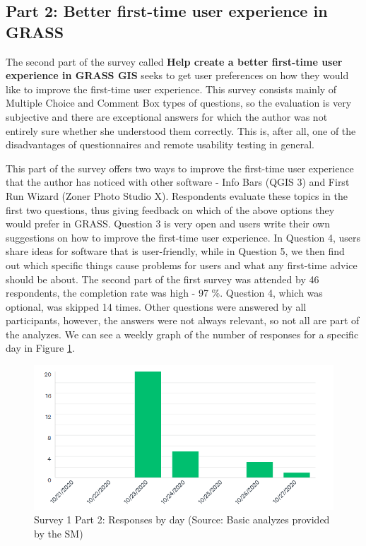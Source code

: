 \documentclass[a4paper,10pt,twoside]{article}
\begin{document}
\newpage
\vspace*{-1cm}
\subsection{Part 2: Better first-time user experience in GRASS}

\noindent The second part of the survey called \textbf{Help create a better first-time user experience in GRASS GIS} seeks to get user preferences on how they would like to improve the first-time user experience. This survey consists mainly of Multiple Choice and Comment Box types of questions, so the evaluation is very subjective and there are exceptional answers for which the author was not entirely sure whether she understood them correctly. This is, after all, one of the disadvantages of questionnaires and remote usability testing in general.

This part of the survey offers two ways to improve the first-time user experience that the author has noticed with other software - Info Bars (QGIS 3) and First Run Wizard (Zoner Photo Studio X). Respondents evaluate these topics in the first two questions, thus giving feedback on which of the above options they would prefer in GRASS. Question 3 is very open and users write their own suggestions on how to improve the first-time user experience. In Question 4, users share ideas for software that is user-friendly, while in Question 5, we then find out which specific things cause problems for users and what any first-time advice should be about. The second part of the first survey was attended by 46 respondents, the completion rate was high - 97 \%. Question 4, which was optional, was skipped 14 times. Other questions were answered by all participants, however, the answers were not always relevant, so not all are part of the analyzes. We can see a weekly graph of the number of responses for a specific day in Figure \ref{fig:survey1_part2_insight2}.

\vspace{0.3cm}
\begin{figure}[hbt!] 
\begin{center}
\includegraphics[width=15cm]{../surveys/analyzed_data/survey1_part2_insight2.png} 
\caption[Survey 1 Part 2: Responses by day]{Survey 1 Part 2: Responses by day (Source: Basic analyzes provided by the SM)}
\label{fig:survey1_part2_insight2}
\end{center}
\end{figure}
\end{document}
